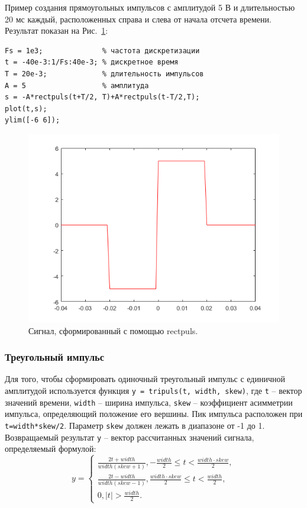 \documentclass[12pt,a4paper]{article}
\begin{document}
Пример создания прямоугольных импульсов с амплитудой 5 В и длительностью 20 мс каждый, расположенных справа и слева от начала отсчета времени. Результат показан на Рис.~\ref{fig:img_rectpuls}:
\begin{verbatim}
Fs = 1e3;              % частота дискретизации
t = -40e-3:1/Fs:40e-3; % дискретное время
T = 20e-3;             % длительность импульсов
A = 5                  % амплитуда
s = -A*rectpuls(t+T/2, T)+A*rectpuls(t-T/2,T);
plot(t,s);
ylim([-6 6]);
\end{verbatim}
\begin{figure}[!ht]
  \centering
  \includegraphics[width=\linewidth]{img_rectpuls}
  \caption{Сигнал, сформированный с помощью rectpuls.}
  \label{fig:img_rectpuls}
\end{figure}

\subsubsection{Треугольный импульс}
Для того, чтобы сформировать одиночный треугольный импульс с единичной амплитудой используется функция \verb|y = tripuls(t, width, skew)|, где \verb|t| -- вектор значений времени, \verb|width| --  ширина импульса, \verb|skew| -- коэффициент асимметрии импульса, определяющий положение его вершины. Пик импульса расположен при \verb|t=width*skew/2|. Параметр \verb|skew| должен лежать в диапазоне от -1 до 1.
Возвращаемый результат \verb|y| -- вектор рассчитанных значений сигнала, определяемый формулой:
\begin{equation}
  y=
  \begin{cases}
    \frac{2t+width}{width(skew+1)}, -\frac{width}{2} \leq t < \frac{width \cdot skew}{2}, \\
    \frac{2t-width}{width(skew-1)}, \frac{width \cdot skew}{2} \leq t < \frac{width}{2}, \\
    0, |t|>\frac{width}{2}.
  \end{cases}
\end{equation}
\end{document}
